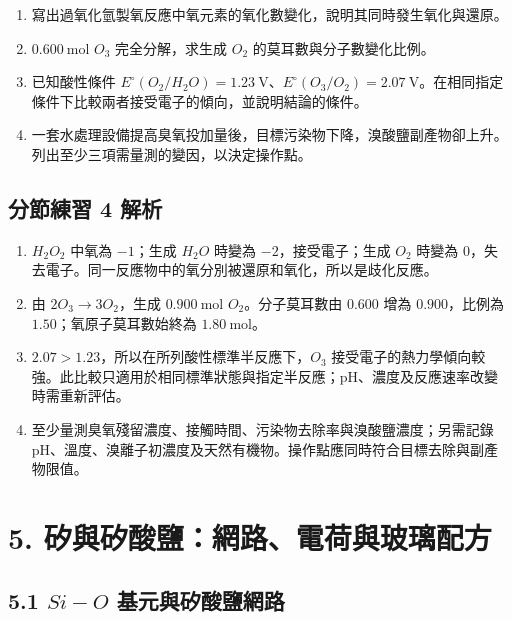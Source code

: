 \documentclass[11pt,a4paper]{article}
\providecommand{\tightlist}{%
  \setlength{\itemsep}{0pt}\setlength{\parskip}{0pt}}
\begin{document}
\begin{enumerate}
\def\labelenumi{\arabic{enumi}.}
\tightlist
\item
  寫出過氧化氫製氧反應中氧元素的氧化數變化，說明其同時發生氧化與還原。
\item
  \(0.600\ \mathrm{mol}\) \(O_3\) 完全分解，求生成 \(O_2\) 的莫耳數與分子數變化比例。
\item
  已知酸性條件 \(E^\circ(O_2/H_2O)=1.23\ \mathrm{V}\)、\(E^\circ(O_3/O_2)=2.07\ \mathrm{V}\)。在相同指定條件下比較兩者接受電子的傾向，並說明結論的條件。
\item
  一套水處理設備提高臭氧投加量後，目標污染物下降，溴酸鹽副產物卻上升。列出至少三項需量測的變因，以決定操作點。
\end{enumerate}

\subsection{分節練習 4 解析}\label{ux5206ux7bc0ux7df4ux7fd2-4-ux89e3ux6790}

\begin{enumerate}
\def\labelenumi{\arabic{enumi}.}
\tightlist
\item
  \(H_2O_2\) 中氧為 \(-1\)；生成 \(H_2O\) 時變為 \(-2\)，接受電子；生成 \(O_2\) 時變為 \(0\)，失去電子。同一反應物中的氧分別被還原和氧化，所以是歧化反應。
\item
  由 \(2O_3\rightarrow3O_2\)，生成 \(0.900\ \mathrm{mol}\) \(O_2\)。分子莫耳數由 \(0.600\) 增為 \(0.900\)，比例為 \(1.50\)；氧原子莫耳數始終為 \(1.80\ \mathrm{mol}\)。
\item
  \(2.07>1.23\)，所以在所列酸性標準半反應下，\(O_3\) 接受電子的熱力學傾向較強。此比較只適用於相同標準狀態與指定半反應；pH、濃度及反應速率改變時需重新評估。
\item
  至少量測臭氧殘留濃度、接觸時間、污染物去除率與溴酸鹽濃度；另需記錄 pH、溫度、溴離子初濃度及天然有機物。操作點應同時符合目標去除與副產物限值。
\end{enumerate}

\section{5. 矽與矽酸鹽：網路、電荷與玻璃配方}\label{ux77fdux8207ux77fdux9178ux9e7dux7db2ux8defux96fbux8377ux8207ux73bbux7483ux914dux65b9}

\subsection{\texorpdfstring{5.1 \(Si-O\) 基元與矽酸鹽網路}{5.1 Si-O 基元與矽酸鹽網路}}\label{si-o-ux57faux5143ux8207ux77fdux9178ux9e7dux7db2ux8def}
\end{document}
